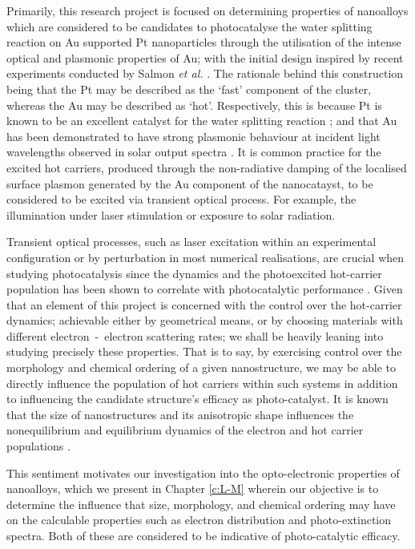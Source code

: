 Primarily, this research project is focused on determining properties of nanoalloys which are considered to be candidates to photocatalyse the water splitting reaction on Au supported Pt nanoparticles through the utilisation of the intense optical and plasmonic properties of Au; with the initial design inspired by recent experiments conducted by Salmon \textit{et al.} \cite{JorgeStructure}. The rationale behind this construction being that the Pt may be described as the `fast' component of the cluster, whereas the Au may be described as `hot'. Respectively, this is because Pt is known to be an excellent catalyst for the water splitting reaction \cite{PtCatalyst}; and that Au has been demonstrated to have strong plasmonic behaviour at incident light wavelengths observed in solar output spectra \cite{AuTRansfer,SolarToChem}. It is common practice for the excited hot carriers, produced through the non-radiative damping of the localised surface plasmon generated by the Au component of the nanocatayst, to be considered to be excited via transient optical process. For example, the illumination under laser stimulation or exposure to solar radiation.  

Transient optical processes, such as laser excitation within an experimental configuration or by perturbation in most numerical realisations, are crucial when studying photocatalysis since the dynamics and the photoexcited hot-carrier population has been shown to correlate with photocatalytic performance \cite{nano9020217}. Given that an element of this project is concerned with the control over the hot-carrier dynamics; achievable either by geometrical means, or by choosing materials with different electron~-~electron scattering rates; we shall be heavily leaning into studying precisely these properties. That is to say, by exercising control over the morphology and chemical ordering of a given nanostructure, we may be able to directly influence the population of hot carriers within such systems in addition to influencing the candidate structure's efficacy as photo-catalyst. It is known that the size of nanostructures and its anisotropic shape influences  the  nonequilibrium  and equilibrium dynamics of the electron and hot carrier populations \cite{AnatolyGeometry,Nicholls2019,PhysRevB.69.195416,PhysRevLett.85.2200}. 

This sentiment motivates our investigation into the opto-electronic properties of nanoalloys, which we present in Chapter \ref{c:L-M} wherein our objective is to determine the influence that size, morphology, and chemical ordering may have on the calculable properties such as electron distribution and photo-extinction spectra. Both of these are considered to be indicative of photo-catalytic efficacy.

